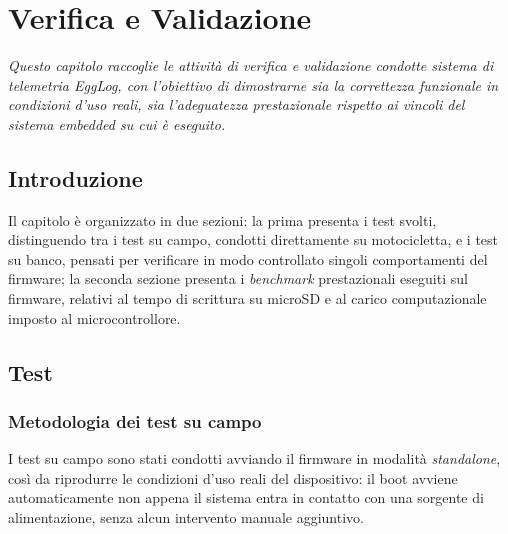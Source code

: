 \chapter{Verifica e Validazione}
\label{chap:verifica_validazione}

\textit{Questo capitolo raccoglie le attività di verifica e validazione condotte sistema di
telemetria EggLog, con l'obiettivo di dimostrarne sia la correttezza funzionale
in condizioni d'uso reali, sia l'adeguatezza prestazionale rispetto ai vincoli
del sistema embedded su cui è eseguito.} 

\section{Introduzione}

Il capitolo è organizzato in due sezioni: la prima presenta i test svolti,
distinguendo tra i test su campo, condotti direttamente su motocicletta, e i
test su banco, pensati per verificare in modo controllato singoli
comportamenti del firmware; la seconda sezione presenta i \textit{benchmark}
prestazionali eseguiti sul firmware, relativi al tempo di scrittura su
microSD e al carico computazionale imposto al microcontrollore.

\section{Test}
\label{sec:test}

\subsection{Metodologia dei test su campo}
\label{subsec:metodologia_test_campo}

I test su campo sono stati condotti avviando il firmware in modalità
\textit{standalone}, così da riprodurre le condizioni d'uso reali del
dispositivo: il boot avviene automaticamente non appena il sistema
entra in contatto con una sorgente di alimentazione, senza alcun intervento
manuale aggiuntivo.

